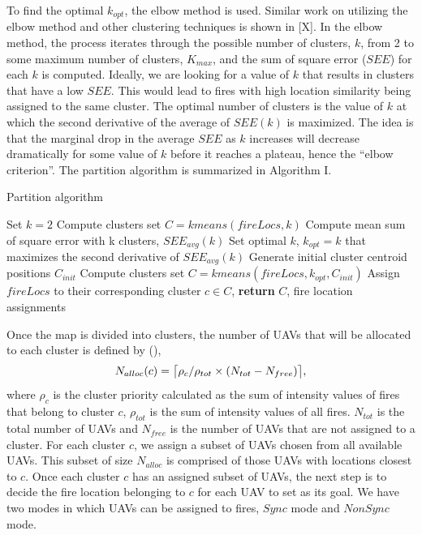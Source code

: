 \documentclass[journal]{IEEEtran}
\DeclarePairedDelimiter{\ceil}{\lceil}{\rceil}
\begin{document}
To find the optimal $k_{opt}$, the elbow method is used. Similar work on utilizing the elbow method and other clustering techniques is shown in [X]. In the elbow method, the process iterates through the possible number of clusters, $k$, from 2 to some maximum number of clusters, $K_{max}$, and the sum of square error ($SEE$) for each $k$ is computed. Ideally, we are looking for a value of $k$ that results in clusters that have a low $SEE$. This would lead to fires with high location similarity being assigned to the same cluster. The optimal number of clusters is the value of $k$ at which the second derivative of the average of $SEE(k)$ is maximized. The idea is that the marginal drop in the average $SEE$ as $k$ increases will decrease dramatically for some value of $k$ before it reaches a plateau, hence the ``elbow criterion''. The partition algorithm is summarized in Algorithm I.
\begin{algorithm}
	\caption{Partition algorithm}\label{alg:kMeans}
	\begin{algorithmic}[1]
		\State Set $k = 2$
		\State Compute clusters set $C = kmeans(fireLocs,k)$ 
		\State Compute mean sum of square error with k clusters, $SEE_{avg}(k)$
		\EndWhile
		\State Set optimal $k$, $k_{opt} = k$ that maximizes the second derivative of $SEE_{avg}(k)$
		\State Generate initial cluster centroid positions $C_{init}$
		\State Compute clusters set $C = kmeans(fireLocs,k_{opt},C_{init})$
		\State Assign $fireLocs$ to their corresponding cluster $c \in C$, 
		\State \textbf{return} $C$, fire location assignments
		\EndProcedure
	\end{algorithmic}
\end{algorithm}

Once the map is divided into clusters, the number of UAVs that will be allocated to each cluster is defined by (),
\begin{equation}
N_{alloc}(c) = \ceil[\big]{\rho_{c}/\rho_{tot}\times(N_{tot} - N_{free})},
\end{equation}
where $\rho_{c}$ is the cluster priority calculated as the sum of intensity values of fires that belong to cluster $c$, $\rho_{tot}$ is the sum of intensity values of all fires. $N_{tot}$ is the total number of UAVs and $N_{free}$ is the number of UAVs that are not assigned to a cluster. For each cluster $c$, we assign a subset of UAVs chosen from all available UAVs. This subset of size $N_{alloc}$ is comprised of those UAVs with locations closest to $c$. Once each cluster $c$ has an assigned subset of UAVs, the next step is to decide the fire location belonging to $c$ for each UAV to set as its goal. We have two modes in which UAVs can be assigned to fires, $Sync$ mode and $NonSync$ mode. 
\end{document}
